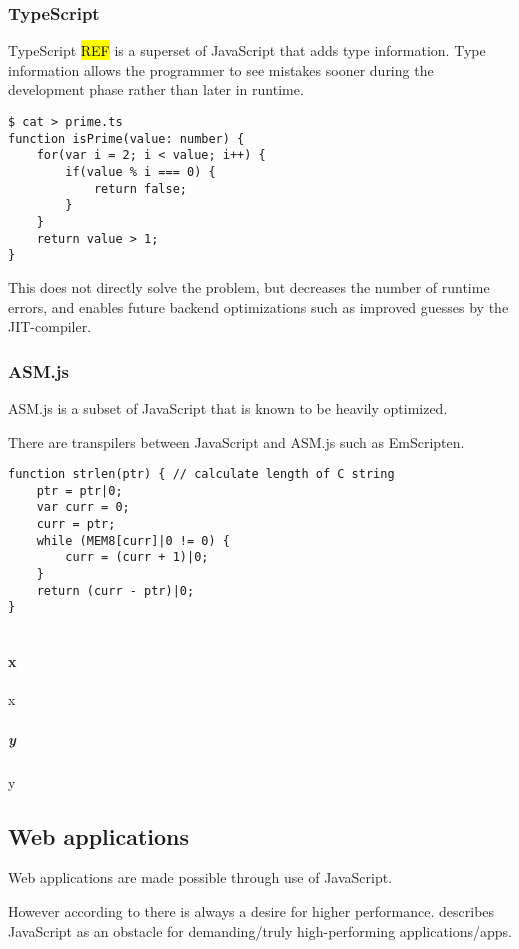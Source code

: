 \subsubsection{TypeScript}

TypeScript \hl{REF} is a superset of JavaScript that adds type information. Type information allows the programmer to see mistakes sooner during the development phase rather than later in runtime.

\begin{verbatim}
$ cat > prime.ts
function isPrime(value: number) {
    for(var i = 2; i < value; i++) {
        if(value % i === 0) {
            return false;
        }
    }
    return value > 1;
}
\end{verbatim}

This does not directly solve the problem, but decreases the number of runtime errors, and enables future backend optimizations such as improved guesses by the JIT-compiler.

\subsubsection{ASM.js}

ASM.js is a subset of JavaScript that is known to be heavily optimized.

There are transpilers between JavaScript and ASM.js such as EmScripten.

\begin{verbatim}
function strlen(ptr) { // calculate length of C string
    ptr = ptr|0;
    var curr = 0;
    curr = ptr;
    while (MEM8[curr]|0 != 0) {
        curr = (curr + 1)|0;
    }
    return (curr - ptr)|0;
}
    
\end{verbatim}

\paragraph{x}

x

\subparagraph{y}

y

\subsection{Web applications}

Web applications are made possible through use of JavaScript.

However according to \textcite{ReiserBlaser2017} there is always a desire for higher performance. \textcite{Zakai2018} describes JavaScript as an obstacle for demanding/truly high-performing applications/apps.

